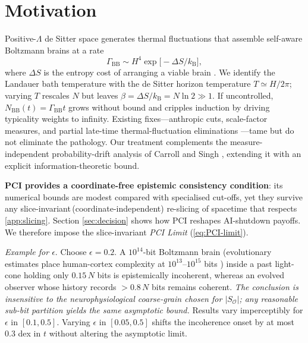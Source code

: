 \documentclass[12pt]{article}
\newcommand{\KB}{k_\mathrm{B}}
\newcommand{\PCI}{PCI\xspace}
\begin{document}
\section{Motivation}\label{sec:intro}
Positive-$\Lambda$ de Sitter space generates thermal fluctuations that assemble self-aware Boltzmann brains at a rate
\begin{equation}
  \Gamma_{\text{BB}}\sim H^{4}\exp\!\bigl[-\Delta S/\!{\KB}\bigr],
  \label{eq:GammaBB}
\end{equation}
where $\Delta S$ is the entropy cost of arranging a viable brain \cite{dyson2002}.
We identify the Landauer bath temperature with the de Sitter horizon temperature
$T\simeq H/2\pi$; varying $T$ rescales $N$ but leaves
$\beta=\Delta S/\!{\KB}=N\ln2\gg1.$
If uncontrolled, $N_{\text{BB}}(t)=\Gamma_{\text{BB}}t$ grows without bound and cripples induction by driving typicality weights to infinity.
Existing fixes—anthropic cuts, scale-factor measures, and partial late-time thermal-fluctuation eliminations \cite{garriga2008,bousso2013,boddy2016,carroll2017,ijjas2018,albrechtSorbo2025}—tame but do not eliminate the pathology.
Our treatment complements the measure-independent probability-drift analysis of Carroll and Singh \cite{carrollSingh2024}, extending it with an explicit information-theoretic bound.

\textbf{\PCI provides a coordinate-free epistemic consistency condition}:
its numerical bounds are modest compared with specialised cut-offs, yet they survive any slice-invariant\,(coordinate-independent) re-slicing of spacetime that respects \autoref{app:slicing}. Section \ref{sec:decision} shows how \PCI reshapes AI-shutdown payoffs.  We therefore impose the slice-invariant \emph{\PCI Limit} (\ref{eq:PCI-limit}).

\vspace{0.5em}\noindent
\textit{Example for $\epsilon.$}  Choose $\epsilon=0.2.$ 
A $10^{14}$-bit Boltzmann brain
(evolutionary estimates place human-cortex complexity at
$10^{13}$–$10^{15}$ bits \cite{bostrom2002})
inside a past light-cone holding only $0.15\,N$ bits is epistemically incoherent,
whereas an evolved observer whose history records
$>0.8\,N$ bits remains coherent.
\textit{The conclusion is insensitive to the neurophysiological
coarse-grain chosen for $|S_{\mathcal O}|$; any reasonable sub-bit
partition yields the same asymptotic bound.}
Results vary imperceptibly for $\epsilon$ in $[0.1,0.5]$.
Varying $\epsilon$ in $[0.05,0.5]$ shifts the incoherence onset by at most
0.3 dex in $t$ without altering the asymptotic limit.
\end{document}
